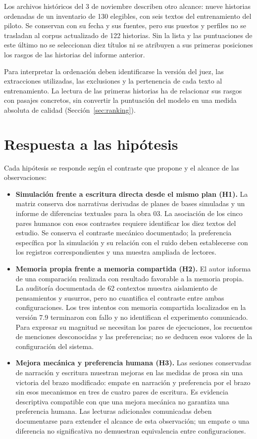 Los archivos históricos del 3 de noviembre describen otro alcance: nueve historias ordenadas de un
inventario de 130 elegibles, con seis textos del entrenamiento del piloto. Se conservan con su fecha
y sus fuentes, pero sus puestos y perfiles no se trasladan al corpus actualizado de 122 historias.
Sin la lista y las puntuaciones de este último no se seleccionan diez títulos ni se atribuyen a sus
primeras posiciones los rasgos de las historias del informe anterior.

Para interpretar la ordenación deben identificarse la versión del juez, las extracciones utilizadas,
las exclusiones y la pertenencia de cada texto al entrenamiento. La lectura de las primeras historias
ha de relacionar sus rasgos con pasajes concretos, sin convertir la puntuación del modelo en una
medida absoluta de calidad (Sección~\ref{sec:ranking}).

\section{Respuesta a las hipótesis}\label{sec:respuesta-hipotesis}

Cada hipótesis se responde según el contraste que propone y el alcance de las observaciones:

\begin{itemize}
  \item \textbf{Simulación frente a escritura directa desde el mismo plan (H1).} La matriz conserva
  dos narrativas derivadas de planes de bases simuladas y un informe de diferencias textuales para
  la obra 03. La asociación de los cinco pares humanos con esos contrastes requiere identificar
  los diez textos del estudio. Se conserva el contraste mecánico documentado; la preferencia
  específica por la simulación y su relación con el ruido deben establecerse con los registros
  correspondientes y una muestra ampliada de lectores.
  \item \textbf{Memoria propia frente a memoria compartida (H2).} El autor informa de una comparación
  realizada con resultado favorable a la memoria propia. La auditoría documentada de 62 contextos
  muestra aislamiento de pensamientos y susurros, pero no cuantifica el contraste entre ambas
  configuraciones. Los tres intentos con memoria compartida localizados en la versión 7.9 terminaron
  con fallo y no identifican el experimento comunicado. Para expresar su magnitud se necesitan los
  pares de ejecuciones, los recuentos de menciones desconocidas y las preferencias; no se deducen
  esos valores de la configuración del sistema.
  \item \textbf{Mejora mecánica y preferencia humana (H3).} Las sesiones conservadas de narración
  y escritura muestran mejoras en las medidas de prosa sin una victoria del brazo modificado:
  empate en narración y preferencia por el brazo sin esos mecanismos en tres de cuatro pares de
  escritura. Es evidencia descriptiva compatible con que una mejora mecánica no garantiza una
  preferencia humana. Las lecturas adicionales comunicadas deben documentarse para extender el
  alcance de esta observación; un empate o una diferencia no significativa no demuestran
  equivalencia entre configuraciones.
\end{itemize}


